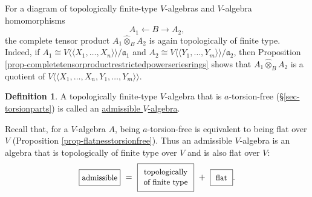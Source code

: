 \documentclass[a4paper,12pt, dvipdfmx]{jsbook}
\def\dl{\langle\!\langle}
\def\dr{\rangle\!\rangle}
\theoremstyle{plain}
\theoremstyle{definition}
\newtheorem{dfn}[thm]{\bfseries Definition}
\begin{document}
For a diagram of topologically finite-type $V$-algebras and $V$-algebra homomorphisms
$$
A_1\longleftarrow B\longrightarrow A_2,
$$
the complete tensor product $A_1\widehat{\otimes}_BA_2$ is again topologically of finite type.
Indeed, if $A_1\cong V\dl X_1,\ldots,X_n\dr/\mathfrak{a}_1$ and $A_2\cong V\dl Y_1,\ldots,Y_m\dr/\mathfrak{a}_2$, then Proposition \ref{prop-completetensorproductrestrictedpowerseriesrings} shows that $A_1\widehat{\otimes}_BA_2$ is a quotient of $V\dl X_1,\ldots,X_n,Y_1,\ldots,Y_m\dr$.

\begin{dfn}\label{dfn-admissiblerings}{\rm 
A topologically finite-type $V$-algebra that is $a$-torsion-free (\S\ref{sec-torsionparts}) is called an \underline{admissible $V$-algebra}.}
\end{dfn}

Recall that, for a $V$-algebra $A$, being $a$-torsion-free is equivalent to being flat over $V$ (Proposition \ref{prop-flatnesstorsionfree}).
Thus an admissible $V$-algebra is an algebra that is topologically of finite type over $V$ and is also flat over $V$:
$$
\fbox{\begin{minipage}{4.2em}\begin{center}\smallskip {\small admissible}\smallskip\end{center}\end{minipage}}\ =\ \fbox{\begin{minipage}{6em}\begin{center}\smallskip {\small topologically of finite type}\smallskip\end{center}\end{minipage}}\ +\ \fbox{\begin{minipage}{2em}\begin{center}\smallskip {\small flat}\smallskip\end{center}\end{minipage}}.
$$
\end{document}
